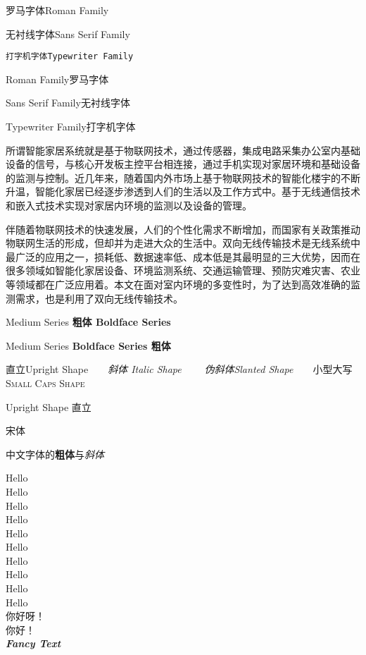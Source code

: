 \documentclass[14pt]{article}   %
\newcommand{\myfont}{\textit{\textbf{\textsf{Fancy Text}}}}
\begin{document}
    \textrm{罗马字体Roman Family}   
    
    \textsf{无衬线字体Sans Serif Family}  
    
    \texttt{打字机字体Typewriter Family}
    
    \rmfamily Roman Family罗马字体 
    
    {\sffamily Sans Serif Family无衬线字体} 
    
    {\ttfamily Typewriter Family打字机字体}

    \sffamily 所谓智能家居系统就是基于物联网技术，通过传感器，集成电路采集办公室内基础设备的信号，与核心开发板主控平台相连接，通过手机实现对家居环境和基础设备的监测与控制。近几年来，随着国内外市场上基于物联网技术的智能化楼宇的不断升温，智能化家居已经逐步渗透到人们的生活以及工作方式中。基于无线通信技术和嵌入式技术实现对家居内环境的监测以及设备的管理。
    
    {\ttfamily 伴随着物联网技术的快速发展，人们的个性化需求不断增加，而国家有关政策推动物联网生活的形成，但却并为走进大众的生活中。双向无线传输技术是无线系统中最广泛的应用之一，损耗低、数据速率低、成本低是其最明显的三大优势，因而在很多领域如智能化家居设备、环境监测系统、交通运输管理、预防灾难灾害、农业等领域都在广泛应用着。本文在面对室内环境的多变性时，为了达到高效准确的监测需求，也是利用了双向无线传输技术。}

    \textmd{Medium Series} \textbf{粗体 Boldface Series}

    {\mdseries Medium Series} {\bfseries Boldface Series 粗体}

    \textup{直立Upright Shape}~~~~\textit{斜体 Italic Shape}~~~~
    \textsl{伪斜体Slanted Shape}~~~~\textsc{小型大写Small Caps Shape}

    {\upshape Upright Shape 直立}\quad{}\quad{}\quad{}

    {\songti 宋体}

    中文字体的\textbf{粗体}与\textit{斜体}

    {\tiny          Hello}\\%
    {\scriptsize    Hello}\\
    {\footnotesize  Hello}\\
    {\small         Hello}\\
    {\normalsize    Hello}\\
    {\large         Hello}\\
    {\Large         Hello}\\
    {\LARGE         Hello}\\
    {\huge          Hello}\\
    {\Huge          Hello}\\

     你好呀！\\
     你好！\\
    \myfont
\end{document}
